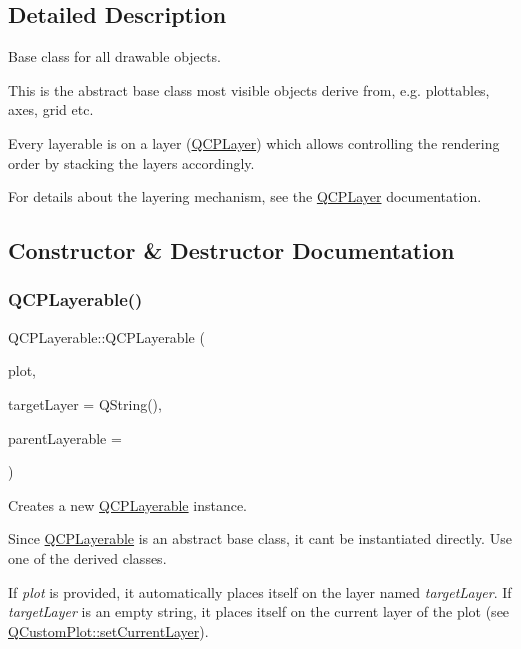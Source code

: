 \subsection{Detailed Description}
Base class for all drawable objects. 

This is the abstract base class most visible objects derive from, e.\+g. plottables, axes, grid etc.

Every layerable is on a layer (\mbox{\hyperlink{class_q_c_p_layer}{Q\+C\+P\+Layer}}) which allows controlling the rendering order by stacking the layers accordingly.

For details about the layering mechanism, see the \mbox{\hyperlink{class_q_c_p_layer}{Q\+C\+P\+Layer}} documentation. 

\subsection{Constructor \& Destructor Documentation}
\mbox{\label{class_q_c_p_layerable_a74c0fa237f29bf0e49565013fc5d1ec0}} 
\subsubsection{\texorpdfstring{Q\+C\+P\+Layerable()}{QCPLayerable()}}
{\footnotesize\ttfamily Q\+C\+P\+Layerable\+::\+Q\+C\+P\+Layerable (\begin{DoxyParamCaption}\item[{\mbox{\hyperlink{class_q_custom_plot}{Q\+Custom\+Plot}} $\ast$}]{plot,  }\item[{Q\+String}]{target\+Layer = {\ttfamily QString()},  }\item[{\mbox{\hyperlink{class_q_c_p_layerable}{Q\+C\+P\+Layerable}} $\ast$}]{parent\+Layerable = {} }\end{DoxyParamCaption})}

Creates a new \mbox{\hyperlink{class_q_c_p_layerable}{Q\+C\+P\+Layerable}} instance.

Since \mbox{\hyperlink{class_q_c_p_layerable}{Q\+C\+P\+Layerable}} is an abstract base class, it can\textquotesingle{}t be instantiated directly. Use one of the derived classes.

If {\itshape plot} is provided, it automatically places itself on the layer named {\itshape target\+Layer}. If {\itshape target\+Layer} is an empty string, it places itself on the current layer of the plot (see \mbox{\hyperlink{class_q_custom_plot_a73a6dc47c653bb6f8f030abca5a11852}{Q\+Custom\+Plot\+::set\+Current\+Layer}}).


